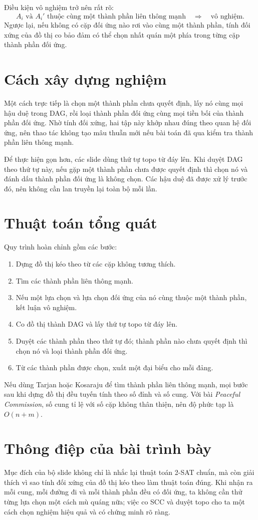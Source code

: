 \documentclass[11pt]{article}
\begin{document}
Điều kiện vô nghiệm trở nên rất rõ:
\[
  A_i \text{ và } A_i' \text{ thuộc cùng một thành phần liên thông mạnh}
  \quad\Longrightarrow\quad \text{vô nghiệm}.
\]
Ngược lại, nếu không có cặp đối ứng nào rơi vào cùng một thành phần, tính
đối xứng của đồ thị co bảo đảm có thể chọn nhất quán một phía trong từng
cặp thành phần đối ứng.

\section{Cách xây dựng nghiệm}

Một cách trực tiếp là chọn một thành phần chưa quyết định, lấy nó cùng mọi
hậu duệ trong DAG, rồi loại thành phần đối ứng cùng mọi tiền bối của thành
phần đối ứng. Nhờ tính đối xứng, hai tập này khớp nhau đúng theo quan hệ
đối ứng, nên thao tác không tạo mâu thuẫn mới nếu bài toán đã qua kiểm tra
thành phần liên thông mạnh.

Để thực hiện gọn hơn, các slide dùng thứ tự topo từ đáy lên. Khi duyệt DAG
theo thứ tự này, nếu gặp một thành phần chưa được quyết định thì chọn nó và
đánh dấu thành phần đối ứng là không chọn. Các hậu duệ đã được xử lý trước
đó, nên không cần lan truyền lại toàn bộ mỗi lần.

\section{Thuật toán tổng quát}

Quy trình hoàn chỉnh gồm các bước:
\begin{enumerate}
  \item Dựng đồ thị kéo theo từ các cặp không tương thích.
  \item Tìm các thành phần liên thông mạnh.
  \item Nếu một lựa chọn và lựa chọn đối ứng của nó cùng thuộc một thành
  phần, kết luận vô nghiệm.
  \item Co đồ thị thành DAG và lấy thứ tự topo từ đáy lên.
  \item Duyệt các thành phần theo thứ tự đó; thành phần nào chưa quyết định
  thì chọn nó và loại thành phần đối ứng.
  \item Từ các thành phần được chọn, xuất một đại biểu cho mỗi đảng.
\end{enumerate}

Nếu dùng Tarjan hoặc Kosaraju để tìm thành phần liên thông mạnh, mọi bước
sau khi dựng đồ thị đều tuyến tính theo số đỉnh và số cung. Với bài
\textit{Peaceful Commission}, số cung tỉ lệ với số cặp không thân thiện, nên
độ phức tạp là \(O(n+m)\).

\section{Thông điệp của bài trình bày}

Mục đích của bộ slide không chỉ là nhắc lại thuật toán 2-SAT chuẩn, mà còn
giải thích vì sao tính đối xứng của đồ thị kéo theo làm thuật toán đúng. Khi
nhận ra mỗi cung, mỗi đường đi và mỗi thành phần đều có đối ứng, ta không
cần thử từng lựa chọn một cách mù quáng nữa; việc co SCC và duyệt topo cho
ta một cách chọn nghiệm hiệu quả và có chứng minh rõ ràng.
\end{document}
